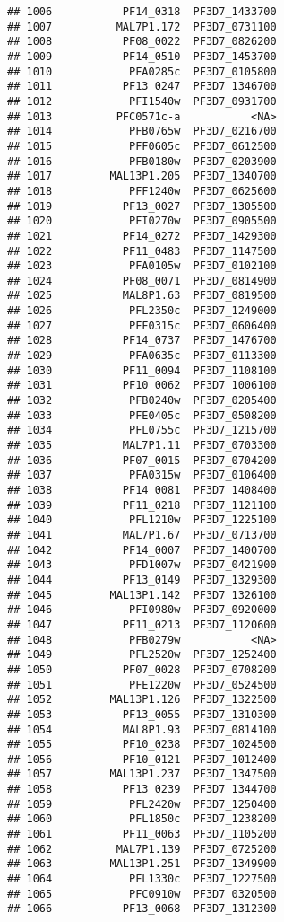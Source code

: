 \documentclass[12pt, a4paper]{article}\usepackage[]{graphicx}\usepackage[]{color}
\makeatletter
\newenvironment{kframe}{%
 \def\at@end@of@kframe{}%
 \ifinner\ifhmode%
  \def\at@end@of@kframe{\end{minipage}}%
  \begin{minipage}{\columnwidth}%
 \fi\fi%
 \def\FrameCommand##1{\hskip\@totalleftmargin \hskip-\fboxsep
 \colorbox{shadecolor}{##1}\hskip-\fboxsep
     \hskip-\linewidth \hskip-\@totalleftmargin \hskip\columnwidth}%
 \MakeFramed {\advance\hsize-\width
   \@totalleftmargin\z@ \linewidth\hsize
   \@setminipage}}%
 {\par\unskip\endMakeFramed%
 \at@end@of@kframe}
\newenvironment{knitrout}{}{} %
\makeatother
\begin{document}
\begin{knitrout}
\begin{kframe}
\begin{verbatim}
## 1006           PF14_0318  PF3D7_1433700
## 1007          MAL7P1.172  PF3D7_0731100
## 1008           PF08_0022  PF3D7_0826200
## 1009           PF14_0510  PF3D7_1453700
## 1010            PFA0285c  PF3D7_0105800
## 1011           PF13_0247  PF3D7_1346700
## 1012            PFI1540w  PF3D7_0931700
## 1013          PFC0571c-a           <NA>
## 1014            PFB0765w  PF3D7_0216700
## 1015            PFF0605c  PF3D7_0612500
## 1016            PFB0180w  PF3D7_0203900
## 1017         MAL13P1.205  PF3D7_1340700
## 1018            PFF1240w  PF3D7_0625600
## 1019           PF13_0027  PF3D7_1305500
## 1020            PFI0270w  PF3D7_0905500
## 1021           PF14_0272  PF3D7_1429300
## 1022           PF11_0483  PF3D7_1147500
## 1023            PFA0105w  PF3D7_0102100
## 1024           PF08_0071  PF3D7_0814900
## 1025           MAL8P1.63  PF3D7_0819500
## 1026            PFL2350c  PF3D7_1249000
## 1027            PFF0315c  PF3D7_0606400
## 1028           PF14_0737  PF3D7_1476700
## 1029            PFA0635c  PF3D7_0113300
## 1030           PF11_0094  PF3D7_1108100
## 1031           PF10_0062  PF3D7_1006100
## 1032            PFB0240w  PF3D7_0205400
## 1033            PFE0405c  PF3D7_0508200
## 1034            PFL0755c  PF3D7_1215700
## 1035           MAL7P1.11  PF3D7_0703300
## 1036           PF07_0015  PF3D7_0704200
## 1037            PFA0315w  PF3D7_0106400
## 1038           PF14_0081  PF3D7_1408400
## 1039           PF11_0218  PF3D7_1121100
## 1040            PFL1210w  PF3D7_1225100
## 1041           MAL7P1.67  PF3D7_0713700
## 1042           PF14_0007  PF3D7_1400700
## 1043            PFD1007w  PF3D7_0421900
## 1044           PF13_0149  PF3D7_1329300
## 1045         MAL13P1.142  PF3D7_1326100
## 1046            PFI0980w  PF3D7_0920000
## 1047           PF11_0213  PF3D7_1120600
## 1048            PFB0279w           <NA>
## 1049            PFL2520w  PF3D7_1252400
## 1050           PF07_0028  PF3D7_0708200
## 1051            PFE1220w  PF3D7_0524500
## 1052         MAL13P1.126  PF3D7_1322500
## 1053           PF13_0055  PF3D7_1310300
## 1054           MAL8P1.93  PF3D7_0814100
## 1055           PF10_0238  PF3D7_1024500
## 1056           PF10_0121  PF3D7_1012400
## 1057         MAL13P1.237  PF3D7_1347500
## 1058           PF13_0239  PF3D7_1344700
## 1059            PFL2420w  PF3D7_1250400
## 1060            PFL1850c  PF3D7_1238200
## 1061           PF11_0063  PF3D7_1105200
## 1062          MAL7P1.139  PF3D7_0725200
## 1063         MAL13P1.251  PF3D7_1349900
## 1064            PFL1330c  PF3D7_1227500
## 1065            PFC0910w  PF3D7_0320500
## 1066           PF13_0068  PF3D7_1312300

\end{verbatim}
\end{kframe}
\end{knitrout}
\end{document}
